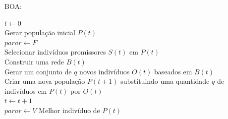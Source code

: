 \documentclass[]{article}
\begin{document}
BOA: \\

\begin{algorithm}[H]
	$t \gets 0$ \\
	Gerar população inicial $P(t)$ \\	
	$parar \gets F$ \\
	 {
		Selecionar indivíduos promissores $S(t)$ em $P(t)$ \\
		Construir uma rede $B(t)$\\
		Gerar um conjunto de $q$ novos indivíduos $O(t)$ baseados em $B(t)$ \\
		Criar uma nova população $P(t+1)$ substituindo uma quantidade $q$ de indivíduos em $P(t)$ por $O(t)$ \\
		$t \gets t + 1$ \\
		{
			$parar \gets V$
		}
	}
	\Retorna Melhor indivíduo de $P(t)$
		
\label{alg:boa}
\caption{\textsc{Algoritmo de Otimização Bayesiana}}
\end{algorithm}
\end{document}
